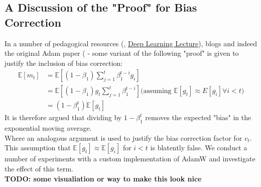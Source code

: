 \documentclass[12pt]{book}
\newcommand{\E}{\mathbb{E}}
\newcommand{\todo}[1]{{\color{red}\bf{TODO: #1}}}
\begin{document}
\subsection{A Discussion of the "Proof" for Bias Correction}
In a number of pedagogical resources (\cite{Goodfellow-et-al-2016}, \href{https://uni-tuebingen.de/fakultaeten/mathematisch-naturwissenschaftliche-fakultaet/fachbereiche/informatik/lehrstuehle/autonomous-vision/lectures/deep-learning/}{Deep Learning Lecture}), blogs and indeed the original Adam paper (\cite{kingma2017adammethodstochasticoptimization} - some variant of the following "proof" is given to justify the inclusion of bias correction:
\begin{align*}
	\E[m_t] &= \E\left[ (1-\beta_1)\sum_{j=1}^{t} {\beta_1^{t-i} g_i}  \right]  \\
		&= \E\left[(1-\beta_1)g_t \sum_{j=1}^{t} {\beta_1^{t-i}}\right] (\text{assuming $\E[g_t] \approx E[g_i]\forall i<t$)}\\
		&= (1-\beta_1^{t})\E[g_t]
\end{align*}
It is therefore argued that dividing by  $1-\beta_1^{t}$ removes the expected "bias" in the exponential moving average.\\ 
Where an analogous argument is used to justify the bias correction factor for $v_t$. \\
This assumption that $\E[g_t] \approx \E[g_i]$ for $i<t$ is blatently false. We conduct a number of experiments with a custom implementation of AdamW and investigate the effect of this term.
\\
\todo{some visualiation or way to make this look nice}
\end{document}
